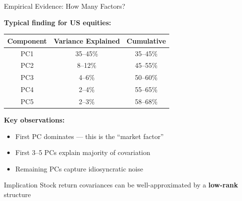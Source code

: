 \documentclass[10pt]{beamer}
\newcommand{\highlight}[1]{\textcolor{AccentOrange}{\textbf{#1}}}
\begin{document}
\begin{frame}{Empirical Evidence: How Many Factors?}

  \textbf{Typical finding for US equities:}

  \vspace{0.5em}
  \begin{center}
  \begin{tabular}{ccc}
    \toprule
    \textbf{Component} & \textbf{Variance Explained} & \textbf{Cumulative} \\
    \midrule
    PC1 & 35--45\% & 35--45\% \\
    PC2 & 8--12\% & 45--55\% \\
    PC3 & 4--6\% & 50--60\% \\
    PC4 & 2--4\% & 55--65\% \\
    PC5 & 2--3\% & 58--68\% \\
    \bottomrule
  \end{tabular}
  \end{center}

  \vspace{0.5em}
  \textbf{Key observations:}
  \begin{itemize}
    \item First PC dominates --- this is the ``market factor''
    \item First 3--5 PCs explain majority of covariation
    \item Remaining PCs capture idiosyncratic noise
  \end{itemize}

  \vspace{0.3em}
  \begin{block}{Implication}
    Stock return covariances can be well-approximated by a \highlight{low-rank} structure
  \end{block}
\end{frame}

\end{document}
